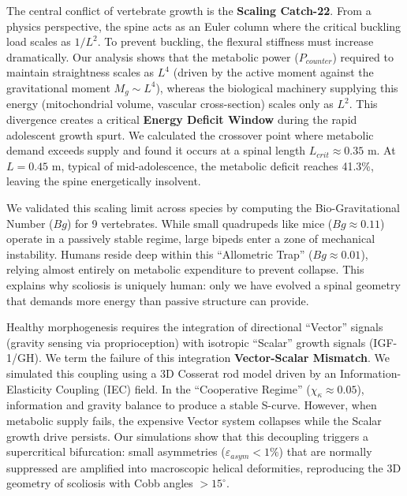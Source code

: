 \documentclass[12pt]{article}
\begin{document}
The central conflict of vertebrate growth is the \textbf{Scaling Catch-22}. From a physics perspective, the spine acts as an Euler column where the critical buckling load scales as $1/L^2$. To prevent buckling, the flexural stiffness must increase dramatically. Our analysis shows that the metabolic power ($P_{counter}$) required to maintain straightness scales as $L^4$ (driven by the active moment against the gravitational moment $M_g \sim L^4$), whereas the biological machinery supplying this energy (mitochondrial volume, vascular cross-section) scales only as $L^2$\cite{west1997,rolfe1997}. This divergence creates a critical \textbf{Energy Deficit Window} during the rapid adolescent growth spurt. We calculated the crossover point where metabolic demand exceeds supply and found it occurs at a spinal length $L_{crit} \approx 0.35$ m. At $L=0.45$ m, typical of mid-adolescence, the metabolic deficit reaches 41.3\%, leaving the spine energetically insolvent.

We validated this scaling limit across species by computing the Bio-Gravitational Number ($Bg$) for 9 vertebrates. While small quadrupeds like mice ($Bg \approx 0.11$) operate in a passively stable regime, large bipeds enter a zone of mechanical instability. Humans reside deep within this ``Allometric Trap'' ($Bg \approx 0.01$), relying almost entirely on metabolic expenditure to prevent collapse. This explains why scoliosis is uniquely human: only we have evolved a spinal geometry that demands more energy than passive structure can provide.

Healthy morphogenesis requires the integration of directional ``Vector'' signals (gravity sensing via proprioception) with isotropic ``Scalar'' growth signals (IGF-1/GH). We term the failure of this integration \textbf{Vector-Scalar Mismatch}. We simulated this coupling using a 3D Cosserat rod model driven by an Information-Elasticity Coupling (IEC) field. In the ``Cooperative Regime'' ($\chi_\kappa \approx 0.05$), information and gravity balance to produce a stable S-curve. However, when metabolic supply fails, the expensive Vector system collapses while the Scalar growth drive persists. Our simulations show that this decoupling triggers a supercritical bifurcation: small asymmetries ($\varepsilon_{asym} < 1\%$) that are normally suppressed are amplified into macroscopic helical deformities, reproducing the 3D geometry of scoliosis with Cobb angles $>15^\circ$.
\end{document}
